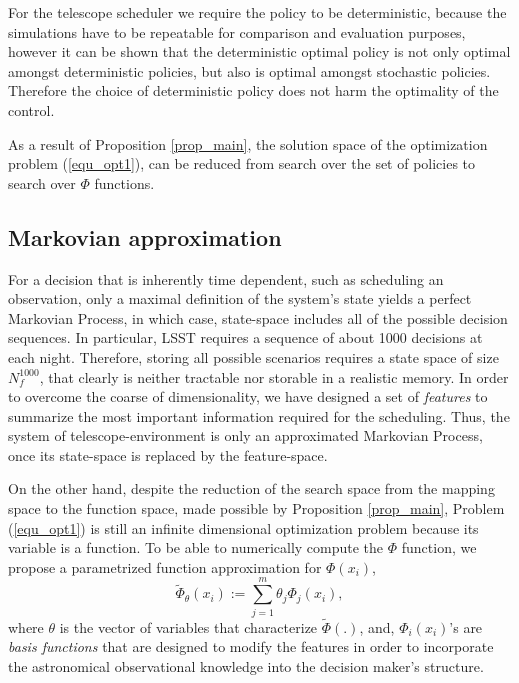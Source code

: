 \documentclass[12pt,aas_macros]{article}
\theoremstyle{definition}
\begin{document}
For the telescope scheduler we require the policy to be deterministic, because the simulations have to be repeatable for comparison and evaluation purposes, however it can be shown that the deterministic optimal policy is not only optimal amongst deterministic policies, but also is optimal amongst stochastic policies. Therefore the choice of deterministic policy does not harm the optimality of the control.

As a result of Proposition \ref{prop_main}, the solution space of the optimization problem (\ref{equ_opt1}), can be reduced from search over the set of policies to search over $\Phi$ functions.


\subsection{Markovian approximation}\label{sec_Markov_approx}

For a decision that is inherently time dependent, such as scheduling an observation, only a maximal definition of the system's state yields a perfect Markovian Process, in which case, state-space includes all of the possible decision sequences. In particular, LSST requires a sequence of about 1000 decisions at each night. Therefore, storing all possible scenarios requires a state space of size $N_{f}^{1000}$, that clearly is neither tractable nor storable in a realistic memory. In order to overcome the coarse of dimensionality, we have designed a set of   \textit{features} to summarize the most important information required for the scheduling. Thus, the system of telescope-environment is only an approximated Markovian Process, once its state-space is replaced by the feature-space. 

On the other hand, despite the reduction of the search space from the mapping space to the function space, made possible by Proposition \ref{prop_main}, Problem (\ref{equ_opt1}) is still an infinite dimensional optimization problem because its variable is a function. To be able to numerically compute the $\Phi$ function, we propose a parametrized function approximation for $\Phi(x_{i})$,
\begin{equation*}
 \tilde{\Phi}_{\theta}({x}_{i}) := \sum_{j=1}^m \theta_j \Phi_j(x_{i}),
\end{equation*}
where $\theta$ is the vector of variables that characterize $\tilde{\Phi}(.)$, and, $\Phi_i(x_i)$'s are \textit{basis functions} that are designed to modify the features in order to incorporate the astronomical observational knowledge into the decision maker's structure.
\end{document}
